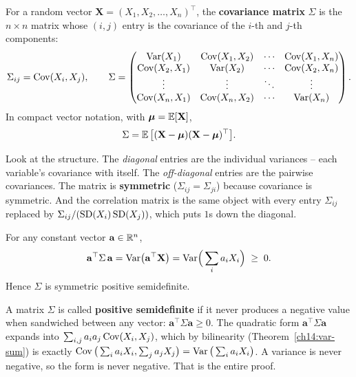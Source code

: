 \begin{definition}
\label{ch14:def-cov-matrix}
For a random vector $\mathbf{X} = (X_1, X_2, \dots, X_n)^\top$, the
\textbf{covariance matrix} $\Sigma$ is the $n \times n$ matrix whose
$(i, j)$ entry is the covariance of the $i$-th and $j$-th components:
\[
\Sigma_{ij} = \operatorname{Cov}(X_i, X_j),
\qquad
\Sigma =
\begin{pmatrix}
\operatorname{Var}(X_1) & \operatorname{Cov}(X_1, X_2) & \cdots & \operatorname{Cov}(X_1, X_n) \\
\operatorname{Cov}(X_2, X_1) & \operatorname{Var}(X_2) & \cdots & \operatorname{Cov}(X_2, X_n) \\
\vdots & \vdots & \ddots & \vdots \\
\operatorname{Cov}(X_n, X_1) & \operatorname{Cov}(X_n, X_2) & \cdots & \operatorname{Var}(X_n)
\end{pmatrix}.
\]
In compact vector notation, with $\boldsymbol\mu = \operatorname{\mathbb{E}}[\mathbf{X}]$,
\[
\Sigma = \operatorname{\mathbb{E}}\big[(\mathbf{X} - \boldsymbol\mu)(\mathbf{X} - \boldsymbol\mu)^\top\big].
\]
\end{definition}

Look at the structure. The \emph{diagonal} entries are the individual variances --
each variable's covariance with itself. The \emph{off-diagonal} entries are the
pairwise covariances. The matrix is \textbf{symmetric} ($\Sigma_{ij} =
\Sigma_{ji}$) because covariance is symmetric. And the correlation matrix is the same
object with every entry $\Sigma_{ij}$ replaced by $\Sigma_{ij}/(\operatorname{SD}(X_i)\operatorname{SD}(X_j))$,
which puts $1$s down the diagonal.

\begin{proposition}
\label{ch14:psd}
For any constant vector $\mathbf{a} \in \mathbb{R}^n$,
\[
\mathbf{a}^\top \Sigma\, \mathbf{a} = \operatorname{Var}\!\big(\mathbf{a}^\top \mathbf{X}\big)
= \operatorname{Var}\!\Big(\sum_i a_i X_i\Big) \;\ge\; 0.
\]
Hence $\Sigma$ is symmetric positive semidefinite.
\end{proposition}

\begin{whybox}
A matrix $\Sigma$ is called \textbf{positive semidefinite} if it never produces a negative value when sandwiched between any vector: $\mathbf{a}^\top \Sigma \mathbf{a} \ge 0$. The quadratic form $\mathbf{a}^\top \Sigma \mathbf{a}$ expands into
$\sum_{i,j} a_i a_j \operatorname{Cov}(X_i, X_j)$, which by bilinearity
(Theorem~\ref{ch14:var-sum}) is exactly $\operatorname{Cov}\big(\sum_i a_i X_i, \sum_j a_j
X_j\big) = \operatorname{Var}\big(\sum_i a_i X_i\big)$. A variance is never negative, so the form
is never negative. That is the entire proof.
\end{whybox}

